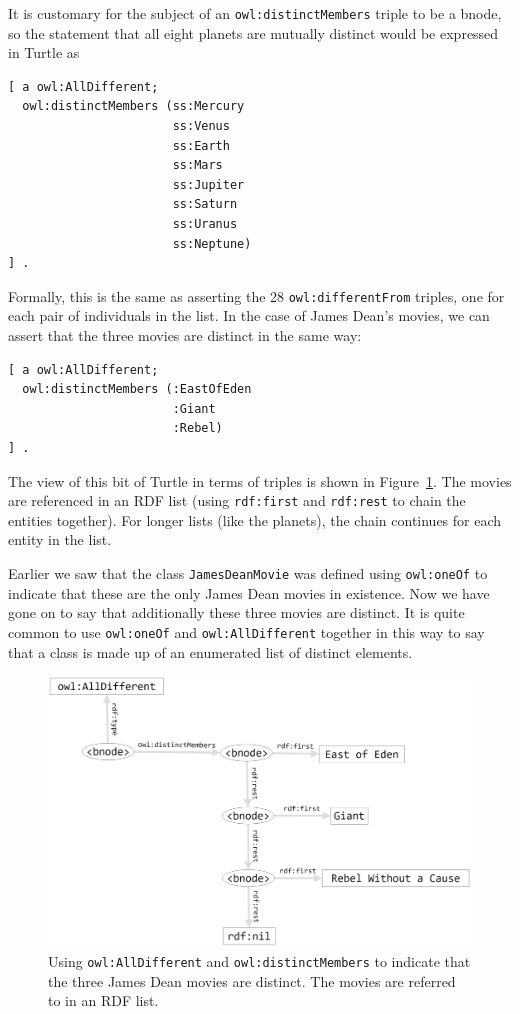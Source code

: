 It is customary for the subject of an \texttt{owl:distinctMembers} triple to be a
bnode, so the
statement that all eight planets are mutually distinct would be
expressed in Turtle as

\begin{lstlisting}
[ a owl:AllDifferent;
  owl:distinctMembers (ss:Mercury
                       ss:Venus
                       ss:Earth
                       ss:Mars
                       ss:Jupiter
                       ss:Saturn
                       ss:Uranus
                       ss:Neptune)
] .
\end{lstlisting}

Formally, this is the same as asserting the 28 \texttt{owl:differentFrom}
triples, one for each pair of individuals in the list. In the case of
James Dean's movies, we can assert that the three movies are distinct in
the same way:

\begin{lstlisting}
[ a owl:AllDifferent;
  owl:distinctMembers (:EastOfEden
                       :Giant
                       :Rebel)
] .
\end{lstlisting}

The view of this bit of Turtle in terms of triples is shown in Figure~\ref{fig:ch13.02}.
The movies are referenced in an RDF list (using \texttt{rdf:first} and \texttt{rdf:rest}
to chain the entities together). For longer lists (like the planets),
the chain continues for each entity in the list.

Earlier we saw that the class \texttt{JamesDeanMovie} was defined using \texttt{owl:oneOf}
to indicate that these are the only James Dean movies in existence. Now
we have gone on to say that additionally these three movies are
distinct. It is quite common to use \texttt{owl:oneOf} and \texttt{owl:AllDifferent}
together in this way to say that a class is made up of an enumerated
list of distinct elements.


\begin{figure}
\centering
\includegraphics[width=5in]{SWWOv3/media/ch13/figure13-2.png}
\caption{Using \texttt{owl:AllDifferent} and \texttt{owl:distinctMembers} to indicate that the
three James Dean movies are distinct. The movies are referred to in an
RDF list.
}
\label{fig:ch13.02}
\end{figure}


